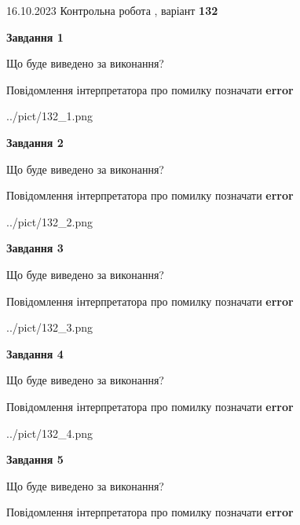 \documentclass[12pt, ukrainian]{article}
\begin{document}
{\Large{16.10.2023 Контрольна робота , варіант  \No \textbf { 132 }\par}}
{
\begin {large}
{\begin {center}\textbf{Завдання 1}\end {center}}\par
Що буде виведено за виконання? \par
Повідомлення інтерпретатора про помилку позначати \textbf{error}

\begin{center}
	{../pict/132_1.png}
\end{center}
\newpage

{\begin {center}\textbf{Завдання 2}\end {center}}\par
Що буде виведено за виконання? \par
Повідомлення інтерпретатора про помилку позначати \textbf{error}

\begin{center}
	{../pict/132_2.png}
\end{center}
\newpage

{\begin {center}\textbf{Завдання 3}\end {center}}\par
Що буде виведено за виконання? \par
Повідомлення інтерпретатора про помилку позначати \textbf{error}

\begin{center}
	{../pict/132_3.png}
\end{center}
\newpage

{\begin {center}\textbf{Завдання 4}\end {center}}\par
Що буде виведено за виконання? \par
Повідомлення інтерпретатора про помилку позначати \textbf{error}

\begin{center}
	{../pict/132_4.png}
\end{center}
\newpage

{\begin {center}\textbf{Завдання 5}\end {center}}\par
Що буде виведено за виконання? \par
Повідомлення інтерпретатора про помилку позначати \textbf{error}


\end{large}}
\end{document}
